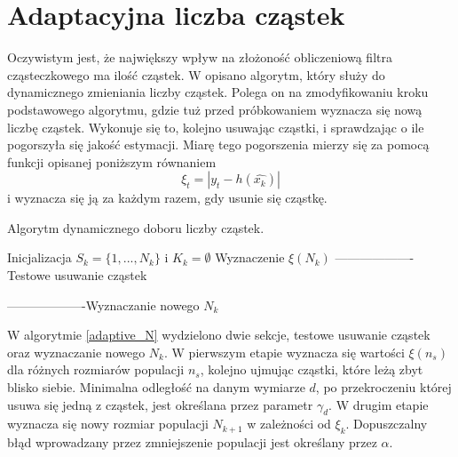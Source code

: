 \section{Adaptacyjna liczba cząstek} \label{adaptive_chapter}
Oczywistym jest, że największy wpływ na złożoność obliczeniową filtra cząsteczkowego ma ilość cząstek. W \cite{adaptive} opisano algorytm, który służy do dynamicznego zmieniania liczby cząstek. Polega on na zmodyfikowaniu kroku  podstawowego algorytmu, gdzie tuż przed próbkowaniem wyznacza się nową liczbę cząstek. Wykonuje się to, kolejno usuwając cząstki, i sprawdzając o ile pogorszyła się jakość estymacji. Miarę tego pogorszenia mierzy się za pomocą funkcji opisanej poniższym równaniem
\begin{equation}\label{ceana_pogorszenia}
	\xi_t = |y_t-h(\hat{x_k})|
\end{equation}
i wyznacza się ją za każdym razem, gdy usunie się cząstkę.

\begin{algorithm}[H]
	\SetAlgoLined
	\DontPrintSemicolon
	\caption{Algorytm dynamicznego doboru liczby cząstek.} \label{adaptive_N}
	Inicjalizacja $S_k=\{1,...,N_k\}$ i $K_k=\emptyset$\;
	Wyznaczenie $\xi(N_k)$\;
	-------------------Testowe usuwanie cząstek\;

	-------------------Wyznaczanie nowego $N_k$\;
	
\end{algorithm}
W algorytmie \ref{adaptive_N} wydzielono dwie sekcje, testowe usuwanie cząstek oraz wyznaczanie nowego $N_k$. W pierwszym etapie wyznacza się wartości $\xi(n_s)$ dla różnych rozmiarów populacji $n_s$, kolejno ujmując cząstki, które leżą zbyt blisko siebie. Minimalna odległość na danym wymiarze $d$, po przekroczeniu której usuwa się jedną z cząstek, jest określana przez parametr $\gamma_d$. W drugim etapie wyznacza się nowy rozmiar populacji $N_{k+1}$ w zależności od $\xi_k$. Dopuszczalny błąd wprowadzany przez zmniejszenie populacji jest określany przez $\alpha$.

